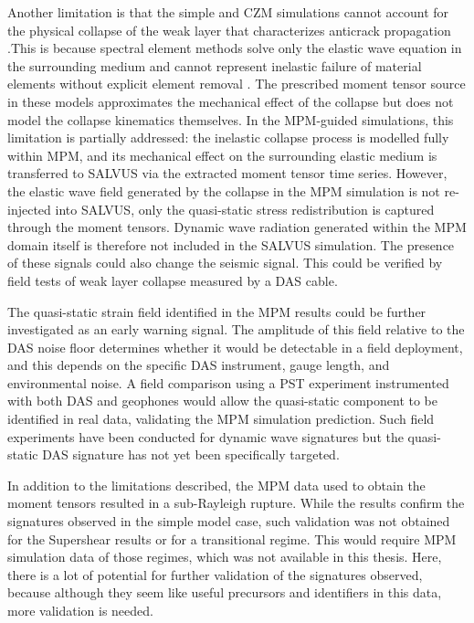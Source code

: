 Another limitation is that the simple and CZM simulations cannot account for the physical collapse
of the weak layer that characterizes anticrack propagation
\parencite{heierliAnticrackNucleationTriggering2008,
heierliAnticracksNewTheory2003}.This is because spectral element methods solve only the elastic wave equation in the surrounding medium and cannot
represent inelastic failure of material elements without explicit element
removal \parencite{podolskiyReviewFiniteelementModelling2013}. The
prescribed moment tensor source in these models approximates the
mechanical effect of the collapse but does not model the collapse
kinematics themselves. In the MPM-guided simulations, this limitation is
partially addressed: the inelastic collapse process is modelled fully
within MPM, and its mechanical effect on the surrounding elastic medium
is transferred to SALVUS via the extracted moment tensor time series.
However, the elastic wave field generated by the collapse in the MPM
simulation is not re-injected into SALVUS, only the quasi-static
stress redistribution is captured through the moment tensors. Dynamic
wave radiation generated within the MPM domain itself is therefore not
included in the SALVUS simulation. The presence of these signals could also change the seismic signal. This could be verified by field tests of weak layer collapse measured by a DAS cable. \par 

The quasi-static strain field identified in the MPM results could be further investigated as an early warning signal. The amplitude of this field relative to the DAS noise floor determines whether it would be detectable in a field deployment, and this depends on the specific DAS instrument, gauge length, and environmental noise. A field comparison using a PST experiment instrumented with both DAS and geophones would allow the quasi-static component to be identified in real data, validating the MPM simulation prediction. Such field experiments have been conducted for dynamic wave signatures
\parencite{bergfeldSignaturesSubRayleighSupershear2025,herwijnenSeismicSensorArray2011} but the quasi-static DAS signature has not yet been specifically targeted. \par

In addition to the limitations described, the MPM data used to obtain the moment tensors resulted in a sub-Rayleigh rupture. While the results confirm the signatures observed in the simple model case, such validation was not obtained for the Supershear results or for a transitional regime. This would require MPM simulation data of those regimes, which was not available in this thesis. Here, there is a lot of potential for further validation of the signatures observed, because although they seem like useful precursors and identifiers in this data, more validation is needed. \par 

